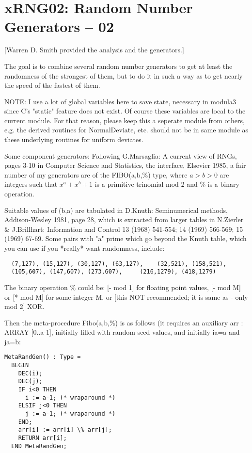 \section{xRNG02: Random Number Generators -- 02}
[Warren D. Smith provided the analysis and the generators.]

The goal is to combine several random number generators to get at least the 
randomness of the strongest of them, but to do it in such a way as
to get nearly the speed of the fastest of them.

NOTE: I use a lot of global variables here to save state,
necessary in modula3 since C's "static" feature does not exist.
Of course these variables are local to the current module.
For that reason, please keep this a seperate module from others,
e.g. the derived routines for NormalDeviate, etc. should not be in
same module as these underlying routines for uniform deviates.

Some component generators:
Following G.Marsaglia: A current view of RNGs, pages 3-10 in
Computer Science and Statistics, the interface, Elsevier 1985,
a fair number of my generators are of the FIBO(a,b,\%) type, where
$a>b>0$ are integers such that $x^a+x^b+1$ is a primitive trinomial
mod 2 and \% is a binary operation.

Suitable values of (b,a) are tabulated in D.Knuth: Seminumerical methods,
Addison-Wesley 1981, page 28, which is extracted from larger tables in
N.Zierler \& J.Brillhart: Information and Control 13 (1968) 541-554;
14 (1969) 566-569; 15 (1969) 67-69. Some pairs with "a" prime which
go beyond the Knuth table, which you can use if you *really*
want randomness, include: 
\begin{verbatim}
  (7,127), (15,127), (30,127), (63,127),    (32,521), (158,521), 
  (105,607), (147,607), (273,607),     (216,1279), (418,1279)
\end{verbatim}

The binary operation \% could be: [- mod 1] for floating point values,
[- mod M] or [* mod M] for some integer M,
or [this NOT recommended; it is same as - only mod 2] XOR.

Then the meta-procedure Fibo(a,b,\%) is as follows (it
requires an auxiliary arr : ARRAY [0..a-1], initially filled with
random seed values, and initially ia=a and ja=b:

\begin{verbatim}
MetaRandGen() : Type =
  BEGIN
    DEC(i);
    DEC(j);
    IF i<0 THEN
      i := a-1; (* wraparound *)
    ELSIF j<0 THEN
      j := a-1; (* wraparound *)
    END;
    arr[i] := arr[i] \% arr[j];
    RETURN arr[i];
  END MetaRandGen;
\end{verbatim}

